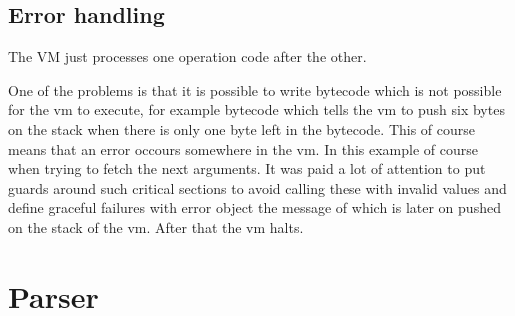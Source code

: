 \subsection{Error handling}
The VM just processes one operation code after the other.

One of the problems is that it is possible to write bytecode which is not possible for the vm to execute, for example bytecode which tells the vm to push six bytes on the stack when there is only one byte left in the bytecode. This of course means that an error occours somewhere in the vm. In this example of course when trying to fetch the next arguments. It was paid a lot of attention to put guards around such critical sections to avoid calling these with invalid values and define graceful failures with error object  the message of which is later on pushed on the stack of the vm. After that the vm halts.


\section{Parser}
